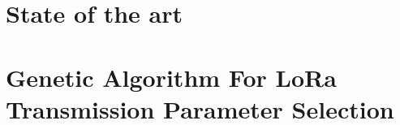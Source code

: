 

% 
\def\printbib{\printbibliography}%

\renewcommand\IEEEkeywordsname{Keywords}


\begin{refsection}
\preface
\body


\chapter[02]{State of the art}
\chapter[06]{Genetic Algorithm For LoRa Transmission Parameter Selection}

\end{refsection}
